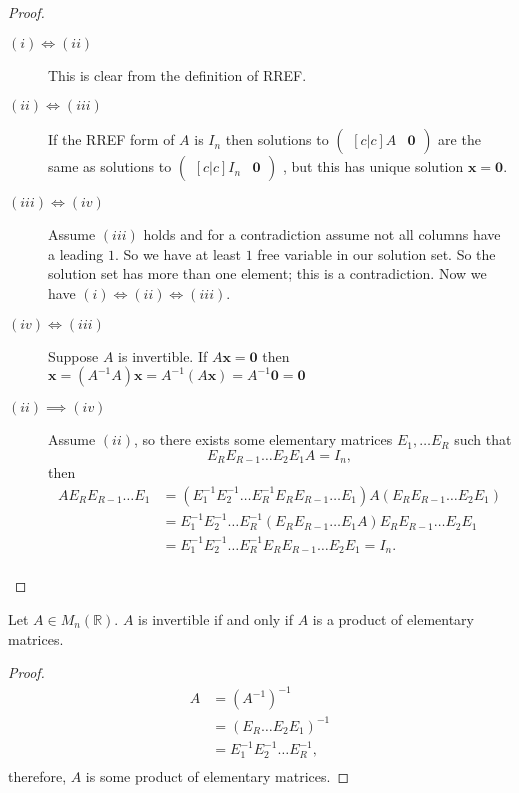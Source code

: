 \begin{proof}
    \begin{description}
        \item[$(i)\iff(ii)$] This is clear from the definition of RREF.
        
        \item[$(ii)\iff(iii)$] If the RREF form of $A$ is $I_n$ then solutions to
        $\begin{pmatrix}[c|c]
            A&\bm 0
        \end{pmatrix}$
        are the same as solutions to
        $\begin{pmatrix}[c|c]
            I_n&\bm 0
        \end{pmatrix}$
        , but this has unique solution $\bm x=\bm 0$.
        
        \item[$(iii)\iff(iv)$] Assume $(iii)$ holds and for a contradiction assume not all columns have a leading $1$. So we have at least $1$ free variable in our solution set. So the solution set has more than one element; this is a contradiction. Now we have $(i)\iff(ii)\iff(iii)$.
        
        \item[$(iv)\iff(iii)$] Suppose $A$ is invertible. If $A\bm x=\bm 0$ then $\bm x=(A^{-1}A)\bm x=A^{-1}(A\bm x)=A^{-1}\bm 0=\bm 0$
        
        \item[$(ii)\implies(iv)$] Assume $(ii)$, so there exists some elementary matrices $E_1,\ldots E_R$ such that \[E_RE_{R-1}\ldots E_2E_1A=I_n,\] then
        \begin{align*}
            AE_RE_{R-1}\ldots E_1&=(E_1^{-1}E_2^{-1}\ldots E_R^{-1}E_RE_{R-1}\ldots E_1)A(E_RE_{R-1}\ldots E_2E_1)\\
            &=E_1^{-1}E_2^{-1}\ldots E_R^{-1}(E_RE_{R-1}\ldots E_1A)E_RE_{R-1}\ldots E_2E_1\\
            &=E_1^{-1}E_2^{-1}\ldots E_R^{-1}E_RE_{R-1}\ldots E_2E_1=I_n.\\
        \end{align*}
    \end{description}
\end{proof}

\begin{corollary}
    Let $A\in M_n(\mathbb R)$. $A$ is invertible if and only if $A$ is a product of elementary matrices.
\end{corollary}

\begin{proof}
    \begin{align*}
        A&=(A^{-1})^{-1}\\
        &=(E_R\ldots E_2E_1)^{-1}\\
        &=E_1^{-1}E_2^{-1}\ldots E_R^{-1},\\
    \end{align*}
    therefore, $A$ is some product of elementary matrices.
\end{proof}

